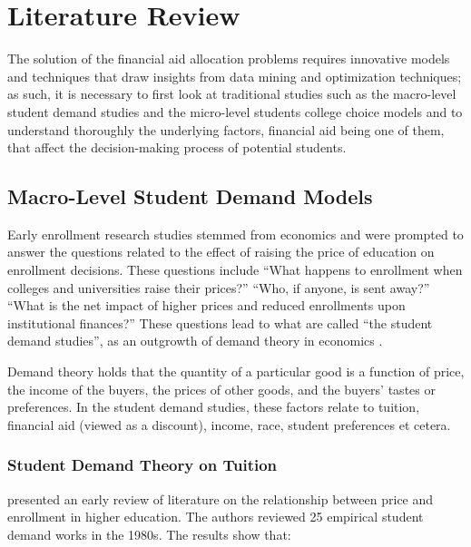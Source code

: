 \documentclass[12pt,english]{report}
\begin{document}
\chapter{Literature Review}
The solution of the financial aid allocation problems requires innovative models and techniques that draw insights from data mining and optimization techniques; as such, it is necessary to first look at traditional studies such as the macro-level student demand studies and the micro-level students college choice models and to understand  thoroughly the underlying factors, financial aid being one of them, that affect the decision-making process of potential students.

\section{Macro-Level Student Demand Models}
Early enrollment research studies stemmed from economics and were prompted to answer the questions related to the effect of raising the price of education on enrollment decisions. These questions include  ``What happens to enrollment when colleges and universities raise their prices?''  ``Who, if anyone, is sent away?''  ``What is the net impact of higher prices and reduced enrollments upon institutional finances?''  These questions  lead to what are called ``the student demand studies'', as an outgrowth of demand theory in economics \citep{Leslie1987,  Leslie1988, Heller1997, Ehrenberg2004, Crouse2015}.

Demand theory holds that the quantity of a particular good is a function of price, the income of the buyers, the prices of other goods, and the buyers' tastes or preferences. In the student demand studies, these factors relate to tuition, financial aid (viewed as a discount), income, race, student preferences et cetera.

\subsection{Student Demand Theory on Tuition}
\citet{Leslie1987} presented an early review of literature on the relationship between price and enrollment in higher education. The authors reviewed 25 empirical student demand works in the 1980s. The results show that:
\end{document}
